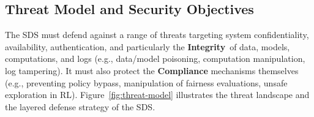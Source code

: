 \documentclass[12pt,a4paper]{report}
\newcommand{\Integrity}{\textbf{Integrity}}
\begin{document}
	\subsection{Threat Model and Security Objectives} %
	\label{sec:4-1-2} %
	
	The SDS must defend against a range of threats targeting system confidentiality, availability, authentication, and particularly the \Integrity\ of data, models, computations, and logs (e.g., data/model poisoning, computation manipulation, log tampering). It must also protect the \textbf{Compliance} mechanisms themselves (e.g., preventing policy bypass, manipulation of fairness evaluations, unsafe exploration in RL). Figure~\ref{fig:threat-model} illustrates the threat landscape and the layered defense strategy of the SDS.
	
\end{document}
